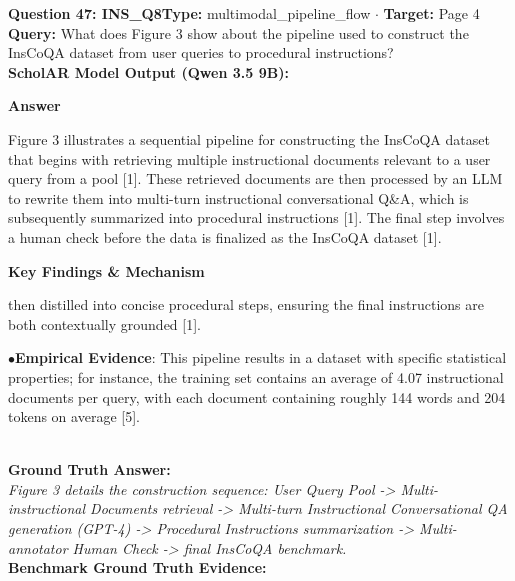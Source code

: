 \documentclass[10pt,a4paper]{article}
\begin{document}
\begin{tcolorbox}[questionbox]
{\noindent\bfseries\large\color{navy} Question 47: INS\_Q8}\hfill {\footnotesize\color{darkteal}\textbf{Type:} multimodal\_pipeline\_flow $\cdot$ \textbf{Target:} Page 4}\\[4pt]
{\noindent\bfseries\color{accentblue} Query: } What does Figure 3 show about the pipeline used to construct the InsCoQA dataset from user queries to procedural instructions?\\[6pt]
{\noindent\bfseries\color{navy} ScholAR Model Output (Qwen 3.5 9B):}\\[2pt]
{\small \noindent \textbf{Answer}\par\vspace{3pt}Figure 3 illustrates a sequential pipeline for constructing the InsCoQA dataset that begins with retrieving multiple instructional documents relevant to a user query from a pool [1]. These retrieved documents are then processed by an LLM to rewrite them into multi-turn instructional conversational Q\&A, which is subsequently summarized into procedural instructions [1]. The final step involves a human check before the data is finalized as the InsCoQA dataset [1].\par\vspace{3pt}\noindent \textbf{Key Findings \& Mechanism}\par\vspace{3pt}then distilled into concise procedural steps, ensuring the final instructions are both contextually grounded [1].\par\vspace{3pt}\noindent\hspace*{8pt}$\bullet$\hspace*{4pt}\textbf{Empirical Evidence}: This pipeline results in a dataset with specific statistical properties; for instance, the training set contains an average of 4.07 instructional documents per query, with each document containing roughly 144 words and 204 tokens on average [5].}\\[6pt]
{\noindent\bfseries\color{darkteal} Ground Truth Answer:}\\[2pt]
{\small\itshape Figure 3 details the construction sequence: User Query Pool -> Multi-instructional Documents retrieval -> Multi-turn Instructional Conversational QA generation (GPT-4) -> Procedural Instructions summarization -> Multi-annotator Human Check -> final InsCoQA benchmark.}\\[4pt]
{\noindent\bfseries\color{darkteal} Benchmark Ground Truth Evidence:}\\[2pt]

\end{tcolorbox}
\end{document}
